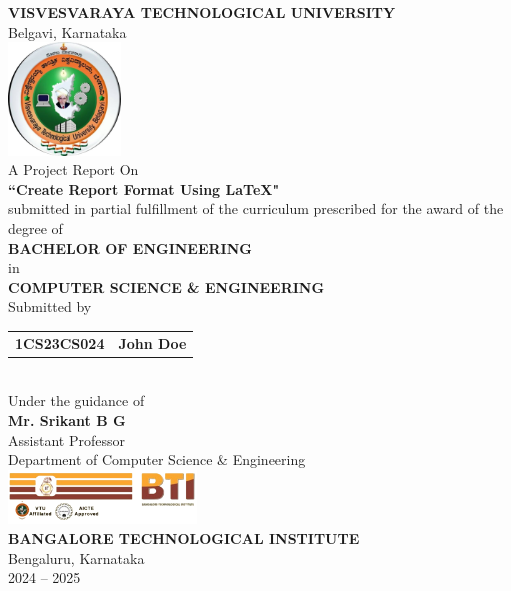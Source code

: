 \documentclass[12pt, a4paper]{report}
\begin{document}
\begin{titlepage}
\centering
    \textbf{\large VISVESVARAYA TECHNOLOGICAL UNIVERSITY} \\
    \small Belgavi, Karnataka \\
    \vspace{10mm}
    \includegraphics[height = 30mm]{logo/vtu.png} \\
    \vspace{10mm}
    A Project Report On \\
    \vspace{2mm}
    \textbf{\large ``Create Report Format Using \LaTeX"} \\
    \vspace{5mm}
    submitted in partial fulfillment of the curriculum prescribed for the award of the degree of \\
    \vspace{5mm}
    \textbf{BACHELOR OF ENGINEERING} \\
    in \\
    \textbf{COMPUTER SCIENCE \& ENGINEERING} \\
    \vspace{10mm}
    Submitted by \\
    \begin{tabular}{ll}
        \textbf{1CS23CS024} & \textbf{John Doe}
    \end{tabular} \\
    \vspace{10mm}
    Under the guidance of \\
    \vspace{2mm}
    \textbf{Mr. Srikant B G} \\
    Assistant Professor \\
    Department of Computer Science \& Engineering \\
    \vspace{10mm}
    \includegraphics[width = 50mm]{logo/bti.png} \\
    \vspace{5mm}
    \textbf{BANGALORE TECHNOLOGICAL INSTITUTE} \\
    Bengaluru, Karnataka \\
    \vspace{10mm}
    2024 -- 2025
\end{titlepage}
\end{document}
